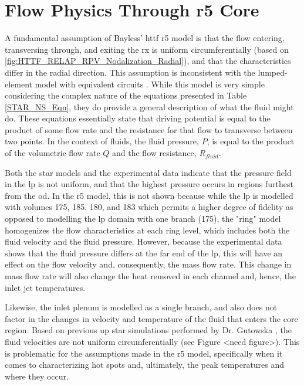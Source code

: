 \documentclass[double,12pt]{beavtex}
\begin{document}
\section{Flow Physics Through \acrshort{r5} Core}

A fundamental assumption of Bayless' \acrshort{httf} \acrshort{r5} model is that the flow entering, transversing through, and exiting the \acrshort{rx} is uniform circumferentially (based on \ref{fig:HTTF_RELAP_RPV_Nodalization_Radial}), and that the characteristics differ in the radial direction. This assumption is inconsistent with the lumped-element model with equivalent circuits \cite{voldman_2022}. While this model is very simple considering the complex nature of the equations presented in Table \ref{STAR_NS_Eqn}, they do provide a general description of what the fluid might do. These equations essentially state that driving potential is equal to the product of some flow rate and the resistance for that flow to transverse between two points. In the context of fluids, the fluid pressure, $P$, is equal to the product of the volumetric flow rate $Q$ and the flow resistance, $R_{fluid}$.

Both the \acrshort{star} models and the experimental data indicate that the pressure field in the \acrshort{lp} is not uniform, and that the highest pressure occurs in regions furthest from the \acrshort{od}. In the \acrshort{r5} model, this is not shown because while the \acrshort{lp} is modelled with volumes 175, 185, 180, and 183 which permits a higher degree of fidelity as opposed to modelling the \acrshort{lp} domain with one branch (175), the "ring" model homogenizes the flow characteristics at each ring level, which includes both the fluid velocity and the fluid pressure. However, because the experimental data shows that the fluid pressure differs at the far end of the \acrshort{lp}, this will have an effect on the flow velocity and, consequently, the mass flow rate. This change in mass flow rate will also change the heat removed in each channel and, hence, the inlet jet temperatures.

Likewise, the inlet plenum is modelled as a single branch, and also does not factor in the changes in velocity and temperature of the fluid that enters the core region. Based on previous \acrshort{up} \acrshort{star} simulations performed by Dr. Gutowska \cite{gutowska_woods_cadell_2019}, the fluid velocities are not uniform circumferentially (see Figure <need figure>). This is problematic for the assumptions made in the \acrshort{r5} model, specifically when it comes to characterizing hot spots and, ultimately, the peak temperatures and where they occur. 
\end{document}
